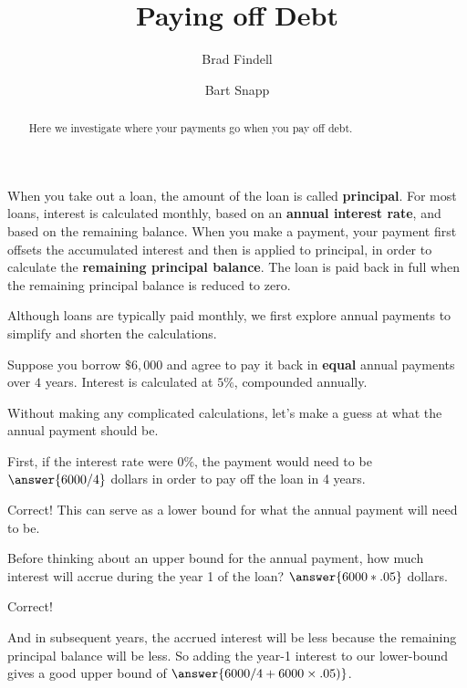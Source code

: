 \documentclass[handout,space,nooutcomes]{ximera}
\title{Paying off Debt}
\author{Brad Findell \and Bart Snapp}
\begin{document}
\begin{abstract}
Here we investigate where your payments go when you pay off debt.
\end{abstract}
\maketitle

When you take out a loan, the amount of the loan is called
\textbf{principal}.  For most loans, interest is calculated monthly,
based on an \textbf{annual interest rate}, and based on the remaining
balance.  When you make a payment, your payment first offsets the
accumulated interest and then is applied to principal, in order to
calculate the \textbf{remaining principal balance}.  The loan is paid
back in full when the remaining principal balance is reduced to zero.


Although loans are typically paid monthly, we first explore annual payments to simplify and shorten the calculations.  

\begin{question}[2.5in]
Suppose you borrow $\$6,000$ and agree to pay it back in \textbf{equal} annual
payments over $4$ years.  Interest is calculated at $5\%$,
compounded annually. 

Without making any complicated calculations, let's make a guess at what the annual payment should be.  

First, if the interest rate were $0\%$, the payment would need to be $\answer{6000/4}$ dollars in order to pay off the loan in 4 years.  

\begin{question}
Correct!  This can serve as a lower bound for what the annual payment will need to be.  

Before thinking about an upper bound for the annual payment, how much interest will accrue during the year 1 of the loan?  
$\answer{6000*.05}$ dollars.  

\begin{question}
Correct!  

And in subsequent years, the accrued interest will be less because the remaining principal balance will be less.  
So adding the year-1 interest to our lower-bound gives a good upper bound of $\answer{6000/4 + 6000\times.05)}$.  
 
\end{question}
\end{question}
\end{question}
\end{document}
